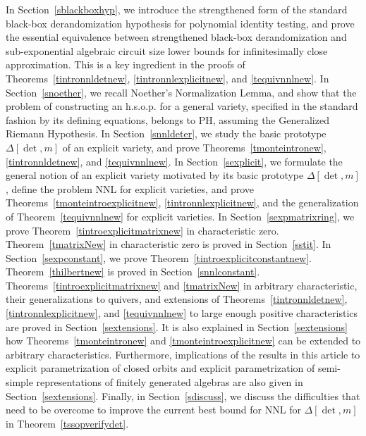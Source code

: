 \documentclass[11pt]{article}
\begin{document}
In Section~\ref{sblackboxhyp}, we introduce the strengthened form of the standard \cite{schnorr,impa,russell,agrawal} 
black-box derandomization hypothesis for polynomial identity testing, and 
prove  the essential equivalence between
strengthened black-box derandomization 
and sub-exponential algebraic circuit size 
lower bounds for infinitesimally close approximation.
This is a  key ingredient in the proofs of 
Theorems~\ref{tintronnldetnew}, \ref{tintronnlexplicitnew}, and \ref{tequivnnlnew}.
In Section~\ref{snoether}, we recall Noether's Normalization Lemma, and show that 
the problem of constructing an h.s.o.p. 
for a general variety, specified  in the  standard fashion by  its
defining equations, belongs to PH, assuming the Generalized Riemann Hypothesis.
In Section~\ref{snnldeter}, we  study  the basic prototype $\Delta[\det,m]$ of an
explicit variety, and prove Theorems~\ref{tmonteintronew}, \ref{tintronnldetnew}, and \ref{tequivnnlnew}.
In Section~\ref{sexplicit}, we  formulate the general notion of an explicit variety  motivated
by its basic prototype $\Delta[\det,m]$,  define the problem NNL for explicit varieties, and 
prove Theorems~\ref{tmonteintroexplicitnew}, \ref{tintronnlexplicitnew}, and the generalization of Theorem~\ref{tequivnnlnew} for 
explicit varieties.
In Section~\ref{sexpmatrixring}, we prove Theorem~\ref{tintroexplicitmatrixnew} in characteristic zero.
Theorem~\ref{tmatrixNew} in characteristic zero
is  proved  in Section~\ref{sstit}. 
In Section~\ref{sexpconstant}, we prove Theorem~\ref{tintroexplicitconstantnew}.
Theorem~\ref{thilbertnew} is  proved in   Section~\ref{snnlconstant}.
Theorems~\ref{tintroexplicitmatrixnew} and \ref{tmatrixNew} in arbitrary  characteristic, their  generalizations to quivers, and 
extensions of Theorems~\ref{tintronnldetnew}, \ref{tintronnlexplicitnew}, and \ref{tequivnnlnew}
to large enough 
positive characteristics are proved in Section~\ref{sextensions}. It is also 
explained in Section~\ref{sextensions} how Theorems~\ref{tmonteintronew} and  \ref{tmonteintroexplicitnew} 
can be extended to  arbitrary characteristics. Furthermore,
implications  of the results in this article to explicit parametrization of closed orbits
and explicit parametrization of semi-simple representations of finitely generated algebras
are also given in Section~\ref{sextensions}.
Finally, in Section~\ref{sdiscuss}, 
we discuss the difficulties that need to be overcome  to improve
the current best bound for NNL for $\Delta[\det,m]$
in  Theorem~\ref{tssopverifydet}.
\end{document}
